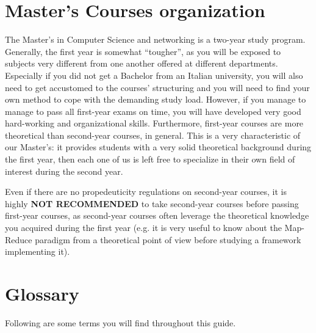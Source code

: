 \documentclass[11pt,fleqn,oneside]{book} %
\begin{document}

\section{Master’s Courses organization}

The Master’s in Computer Science and networking is a two-year study program. Generally, the first year is somewhat “tougher”, as you will be exposed to subjects very different from one another offered at different departments. Especially if you did not get a Bachelor from an Italian university, you will also need to get accustomed  to the courses’ structuring and you will need to find your own method to cope with the demanding study load. However, if you manage to manage to pass all first-year exams on time, you will have developed very good hard-working and organizational skills. Furthermore, first-year courses are more theoretical than second-year courses, in general.  This is a very characteristic of our Master’s: it provides students with a very solid theoretical background during the first year, then each one of us is left free to specialize in their own field of interest during the second year. 

Even if there are no propedeuticity regulations on second-year courses, it is highly \textbf{NOT RECOMMENDED} to take second-year courses before passing first-year courses, as second-year courses often leverage the theoretical knowledge you acquired during the first year (e.g. it is very useful to know about the Map-Reduce paradigm from a theoretical point of view before studying a framework implementing it). 

\section{Glossary}

Following are some terms you will find throughout this guide. 
\end{document}
